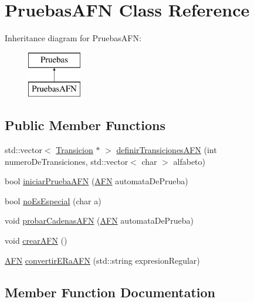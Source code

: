 \hypertarget{class_pruebas_a_f_n}{}\section{Pruebas\+A\+FN Class Reference}
\label{class_pruebas_a_f_n}
Inheritance diagram for Pruebas\+A\+FN\+:\begin{figure}[H]
\begin{center}
\leavevmode
\includegraphics[height=2.000000cm]{class_pruebas_a_f_n}
\end{center}
\end{figure}
\subsection*{Public Member Functions}
\begin{DoxyCompactItemize}
\item 
std\+::vector$<$ \hyperlink{class_transicion}{Transicion} $\ast$ $>$ \hyperlink{class_pruebas_a_f_n_ab895e1c3ac049325060b898084a22a61}{definir\+Transiciones\+A\+FN} (int numero\+De\+Transiciones, std\+::vector$<$ char $>$ alfabeto)
\item 
bool \hyperlink{class_pruebas_a_f_n_a8d6784ce185b05b5e454274674b0a63f}{iniciar\+Prueba\+A\+FN} (\hyperlink{class_a_f_n}{A\+FN} automata\+De\+Prueba)
\item 
bool \hyperlink{class_pruebas_a_f_n_aae54c0ea1b237f04b5b3f8625a1b58d2}{no\+Es\+Especial} (char a)
\item 
void \hyperlink{class_pruebas_a_f_n_a9349654408b4c931fd854f8cd304d324}{probar\+Cadenas\+A\+FN} (\hyperlink{class_a_f_n}{A\+FN} automata\+De\+Prueba)
\item 
void \hyperlink{class_pruebas_a_f_n_a1df5917c3e8b3f2dc1f83744ad30ffdb}{crear\+A\+FN} ()
\item 
\hyperlink{class_a_f_n}{A\+FN} \hyperlink{class_pruebas_a_f_n_a6fe30bfd1b6d13a1ac3a2ad6a6b70750}{convertir\+E\+Ra\+A\+FN} (std\+::string expresion\+Regular)
\end{DoxyCompactItemize}


\subsection{Member Function Documentation}
\mbox{\label{class_pruebas_a_f_n_a6fe30bfd1b6d13a1ac3a2ad6a6b70750}} 
